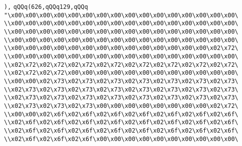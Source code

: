 \verb|),|\newline
\verb|qQQq(626,qQQq129,qQQq|\newline
\verb|"\x00\x00\x00\x00\x00\x00\x00\x00\x00\x00\x00\x00\x00\x00\x00\x00\|\newline
\verb|\\x00\x00\x00\x00\x00\x00\x00\x00\x00\x00\x00\x00\x00\x00\x00\x00\|\newline
\verb|\\x00\x00\x00\x00\x00\x00\x00\x00\x00\x00\x00\x00\x00\x00\x00\x00\|\newline
\verb|\\x00\x00\x00\x00\x00\x00\x00\x00\x00\x00\x00\x00\x00\x00\x00\x00\|\newline
\verb|\\x00\x00\x00\x00\x00\x00\x00\x00\x00\x00\x00\x00\x00\x00\x02\x72\|\newline
\verb|\\x00\x00\x00\x00\x00\x00\x00\x00\x00\x00\x00\x00\x00\x00\x00\x00\|\newline
\verb|\\x02\x72\x02\x72\x02\x72\x02\x72\x02\x72\x02\x72\x02\x72\x02\x72\|\newline
\verb|\\x02\x72\x02\x72\x00\x00\x00\x00\x00\x00\x00\x00\x00\x00\x00\x00\|\newline
\verb|\\x00\x00\x02\x73\x02\x73\x02\x73\x02\x73\x02\x73\x02\x73\x02\x73\|\newline
\verb|\\x02\x73\x02\x73\x02\x73\x02\x73\x02\x73\x02\x73\x02\x73\x02\x73\|\newline
\verb|\\x02\x73\x02\x73\x02\x73\x02\x73\x02\x73\x02\x73\x02\x73\x02\x73\|\newline
\verb|\\x02\x73\x02\x73\x02\x73\x00\x00\x00\x00\x00\x00\x00\x00\x02\x72\|\newline
\verb|\\x00\x00\x02\x6f\x02\x6f\x02\x6f\x02\x6f\x02\x6f\x02\x6f\x02\x6f\|\newline
\verb|\\x02\x6f\x02\x6f\x02\x6f\x02\x6f\x02\x6f\x02\x6f\x02\x6f\x02\x6f\|\newline
\verb|\\x02\x6f\x02\x6f\x02\x6f\x02\x6f\x02\x6f\x02\x6f\x02\x6f\x02\x6f\|\newline
\verb|\\x02\x6f\x02\x6f\x02\x6f\x00\x00\x00\x00\x00\x00\x00\x00\x00\x00\|\newline
